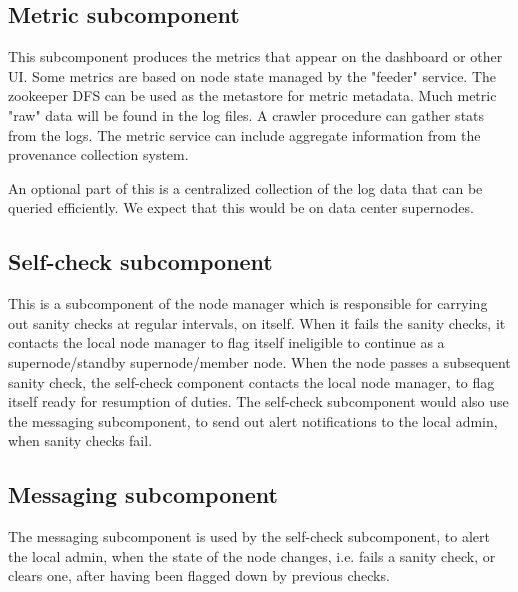 \documentclass[oneside,12pt]{memoir}
\begin{document}
\subsection{Metric subcomponent}

This subcomponent produces the metrics that appear on the dashboard or other UI.  Some metrics are based on node state managed by the "feeder" service.  The zookeeper DFS can be used as the metastore for metric metadata.  Much metric "raw" data will be found in the log files.  A crawler procedure can gather stats from the logs.   The metric service can include aggregate information from the provenance collection system. 



An optional part of this is a centralized collection of the log data that can be queried efficiently.  We expect that this would be on data center supernodes.   
\subsection{Self-check subcomponent}
This is a subcomponent of the node manager which is responsible for carrying out sanity checks at regular intervals, on itself. When it fails the sanity checks, it contacts the local node manager to flag itself ineligible to continue as a supernode/standby supernode/member node. When the node passes a subsequent sanity check, the self-check component contacts the local node manager, to flag itself ready for resumption of duties.  The self-check subcomponent would also use the messaging subcomponent, to send out alert notifications to the local admin, when sanity checks fail.

\subsection{Messaging subcomponent}
The messaging subcomponent is used by the self-check subcomponent, to alert the local admin, when the state of the node changes, i.e. fails a sanity check, or clears one, after having been flagged down by previous checks.
\end{document}
